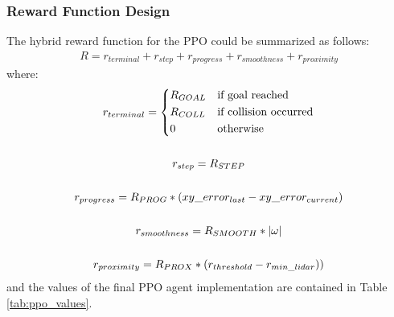 \documentclass[conference]{IEEEtran}
\begin{document}
        \subsubsection{Reward Function Design}
        The hybrid reward function for the PPO could be summarized as follows:
        \begin{gather*}
            R = r_{terminal} + r_{step} + r_{progress} + r_{smoothness} + r_{proximity}
        \end{gather*}
        where:
        \begin{gather*}
            r_{terminal} =
            \begin{dcases}
                R_{GOAL}    & \text{if goal reached} \\
                R_{COLL}    & \text{if collision occurred} \\
                0           & \text{otherwise} \\
            \end{dcases} \\
            \\
            r_{step} = R_{STEP} \\
            \\
            r_{progress} = R_{PROG}*(xy\_error_{last}-xy\_error_{current}) \\
            \\
            r_{smoothness} = R_{SMOOTH}*|\omega| \\
            \\
            r_{proximity} = R_{PROX}*(r_{threshold}-r_{min\_lidar}))
        \end{gather*}
        and the values of the final PPO agent implementation are contained in Table \ref{tab:ppo_values}.
\end{document}
